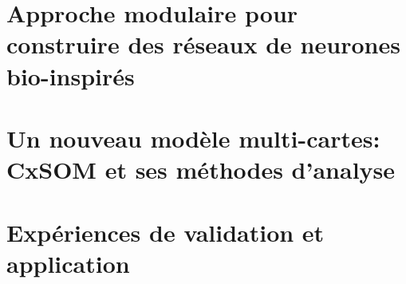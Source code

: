 \documentclass[11pt]{thesul-cs}
\begin{document}
\dominitoc

\tableofcontents

\mainmatter
\part{Approche modulaire pour construire des réseaux de neurones bio-inspirés}


\part{Un nouveau modèle multi-cartes: CxSOM et ses méthodes d'analyse}



\part{Expériences de validation et application}






\end{document}
